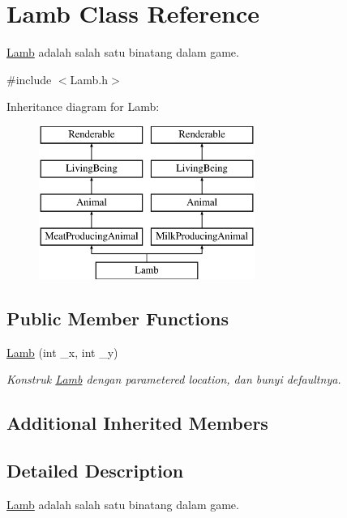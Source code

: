\hypertarget{classLamb}{}\section{Lamb Class Reference}
\label{classLamb}


\mbox{\hyperlink{classLamb}{Lamb}} adalah salah satu binatang dalam game.  




{\ttfamily \#include $<$Lamb.\+h$>$}

Inheritance diagram for Lamb\+:\begin{figure}[H]
\begin{center}
\leavevmode
\includegraphics[height=5.000000cm]{classLamb}
\end{center}
\end{figure}
\subsection*{Public Member Functions}
\begin{DoxyCompactItemize}
\item 
\mbox{\hyperlink{classLamb_ab74133ef64cd43f3ea1127fb847488d4}{Lamb}} (int \+\_\+x, int \+\_\+y)
\begin{DoxyCompactList}\small\item\em Konstruk \mbox{\hyperlink{classLamb}{Lamb}} dengan parametered location, dan bunyi defaultnya. \end{DoxyCompactList}\end{DoxyCompactItemize}
\subsection*{Additional Inherited Members}


\subsection{Detailed Description}
\mbox{\hyperlink{classLamb}{Lamb}} adalah salah satu binatang dalam game. 

